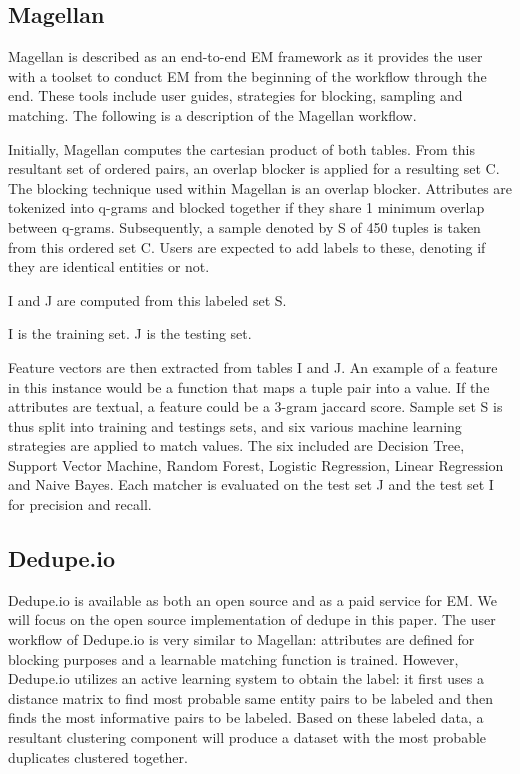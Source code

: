 \documentclass[letterpaper,twocolumn,10pt]{article}
\begin{document}
\subsection{Magellan}
Magellan is described as an end-to-end EM framework as it provides the user with a toolset to conduct EM from the beginning of the workflow through the end. These tools include user guides, strategies for blocking, sampling and matching. The following is a description of the Magellan workflow.

Initially, Magellan computes the cartesian product of both tables. From this resultant set of ordered pairs, an overlap blocker is applied for a resulting set C. The blocking technique used within Magellan is an overlap blocker. Attributes are tokenized into q-grams and blocked together if they share 1 minimum overlap between q-grams. Subsequently, a sample denoted by S of 450 tuples is taken from this ordered set C. Users are expected to add labels to these, denoting if they are identical entities or not.

I and J are computed from this labeled set S. 

I is the training set. J is the testing set.

Feature vectors are then extracted from tables I and J. An example of a feature in this instance would be a function that maps a tuple pair into a value. If the attributes are textual, a feature could be a 3-gram jaccard score. Sample set S is thus split into training and testings sets, and six various machine learning strategies are applied to match values. The six included are Decision Tree, Support Vector Machine, Random Forest, Logistic Regression, Linear Regression and Naive Bayes. Each matcher is evaluated on the test set J and the test set I for precision and recall.

\subsection{Dedupe.io}
Dedupe.io is available as both an open source and as a paid service for EM. We will focus on the open source implementation of dedupe in this paper. The user workflow of Dedupe.io is very similar to Magellan: attributes are defined for blocking purposes and a learnable matching function is trained. However, Dedupe.io utilizes an active learning system to obtain the label: it first uses a distance matrix to find most probable same entity pairs to be labeled and then finds the most informative pairs to be labeled. Based on these labeled data, a resultant clustering component will produce a dataset with the most probable duplicates clustered together.  
\end{document}
